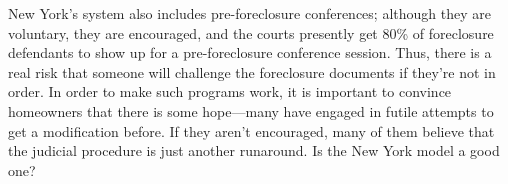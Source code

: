 New York's system also includes pre-foreclosure conferences; although they are
voluntary, they are encouraged, and the courts presently get 80\% of
foreclosure defendants to show up for a pre-foreclosure conference session. 
Thus, there is a real risk that someone will challenge the foreclosure
documents if they're not in order. In order to make such programs work, it is
important to convince homeowners that there is some hope---many have engaged
in futile attempts to get a modification before. If they aren't encouraged,
many of them believe that the judicial procedure is just another runaround. Is
the New York model a good one?

